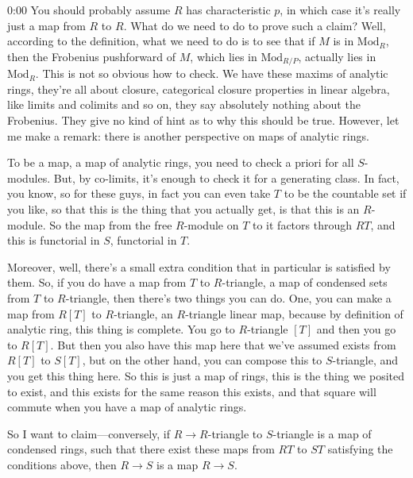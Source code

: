 \begin{unfinished}{0:00}
You should probably assume $R$ has characteristic $p$, in which case it's really just a map from $R$ to $R$. What do we need to do to prove such a claim? Well, according to the definition, what we need to do is to see that if $M$ is in $\mathrm{Mod}_R$, then the Frobenius pushforward of $M$, which lies in $\mathrm{Mod}_{R/P}$, actually lies in $\mathrm{Mod}_R$. This is not so obvious how to check. We have these maxims of analytic rings, they're all about closure, categorical closure properties in linear algebra, like limits and colimits and so on, they say absolutely nothing about the Frobenius. They give no kind of hint as to why this should be true. However, let me make a remark: there is another perspective on maps of analytic rings.

To be a map, a map of analytic rings, you need to check a priori for all $S$-modules. But, by co-limits, it's enough to check it for a generating class. In fact, you know, so for these guys, in fact you can even take $T$ to be the countable set if you like, so that this is the thing that you actually get, is that this is an $R$-module. So the map from the free $R$-module on $T$ to it factors through $RT$, and this is functorial in $S$, functorial in $T$.

Moreover, well, there's a small extra condition that in particular is satisfied by them. So, if you do have a map from $T$ to $R$-triangle, a map of condensed sets from $T$ to $R$-triangle, then there's two things you can do. One, you can make a map from $R[T]$ to $R$-triangle, an $R$-triangle linear map, because by definition of analytic ring, this thing is complete. You go to $R$-triangle $[T]$ and then you go to $R[T]$. But then you also have this map here that we've assumed exists from $R[T]$ to $S[T]$, but on the other hand, you can compose this to $S$-triangle, and you get this thing here. So this is just a map of rings, this is the thing we posited to exist, and this exists for the same reason this exists, and that square will commute when you have a map of analytic rings.

So I want to claim---conversely, if $R \to R$-triangle to $S$-triangle is a map of condensed rings, such that there exist these maps from $RT$ to $ST$ satisfying the conditions above, then $R \to S$ is a map $R \to S$.


\end{unfinished}
